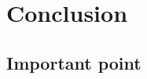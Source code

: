 \chapter{Conclusion}\label{ch:conclusion}
\blindtext[1]
\section{Important point}
\blindtext[1]

\cite{Madsen2010}
